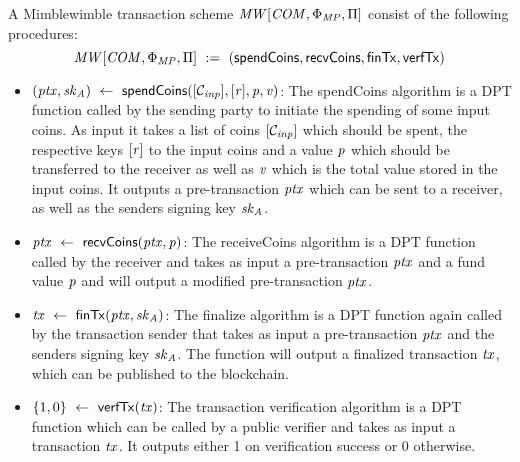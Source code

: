 \begin{definition}
    \label{def:mw-tx-scheme}
    A Mimblewimble transaction scheme $\mathit{MW}[\mathit{COM},\Phi_{\mathit{MP}},\Pi]$ consist of the following procedures:
    \[ \mathit{MW}[\mathit{COM},\Phi_{\mathit{MP}},\Pi] ~:=~ ( \mathsf{spendCoins},\mathsf{recvCoins},\mathsf{finTx},\mathsf{verfTx} ) \]
    \begin{itemize}
        \item $(\mathit{ptx}, \mathit{sk}_{\mathit{A}}) ~\leftarrow~ \mathsf{spendCoins}([\mathcal{C}_{\mathit{inp}}],[\mathit{r}],\mathit{p},\mathit{v})$: The spendCoins algorithm is a DPT function called by the sending party to
        initiate the spending of some input coins. As input it takes a list of coins $[\mathcal{C}_{\mathit{inp}}]$ which should be spent, the respective keys $[\mathit{r}]$ to the input coins and a value $\mathit{p}$ which should be
        transferred to the receiver as well as $\mathit{v}$ which is the total value stored in the input coins. It outputs a pre-transaction $\mathit{ptx}$ which can be sent to a receiver, as well as the senders signing key $\mathit{sk}_{\mathit{A}}$.
        \item $\mathit{ptx} ~\leftarrow~ \mathsf{recvCoins}(\mathit{ptx},\mathit{p})$: The receiveCoins algorithm is a DPT function called by the receiver and takes as input a pre-transaction $\mathit{ptx}$ and a fund value
        $\mathit{p}$ and will output a modified pre-transaction $\mathit{ptx}$.
        \item $\mathit{tx} ~\leftarrow~ \mathsf{finTx}(\mathit{ptx},\mathit{sk}_{\mathit{A}})$: The finalize algorithm is a DPT function again called by the transaction sender that takes as input a pre-transaction $\mathit{ptx}$ and the senders
        signing key $\mathit{sk}_{\mathit{A}}$. The function will output a finalized transaction $\mathit{tx}$, which can be published to the blockchain.
        \item $\{1,0\} ~\leftarrow~ \mathsf{verfTx}(\mathit{tx})$: The transaction verification algorithm is a DPT function which can be called by a public verifier and takes as input a transaction $\mathit{tx}$. It
        outputs either 1 on verification success or 0 otherwise.
    \end{itemize}
\end{definition}

